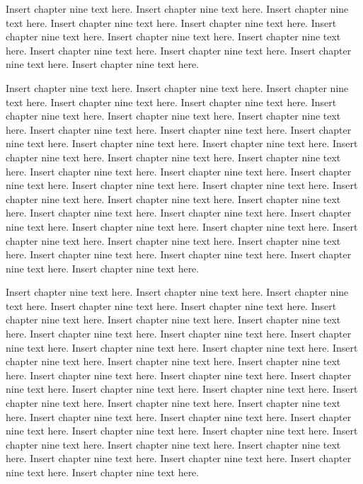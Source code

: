 Insert chapter nine text here. Insert chapter nine text here. Insert chapter nine text here. Insert chapter nine text here. Insert chapter nine text here. Insert chapter nine text here. Insert chapter nine text here. Insert chapter nine text here. Insert chapter nine text here. Insert chapter nine text here. Insert chapter nine text here. Insert chapter nine text here.

Insert chapter nine text here. Insert chapter nine text here. Insert chapter nine text here. Insert chapter nine text here. Insert chapter nine text here. Insert chapter nine text here. Insert chapter nine text here. Insert chapter nine text here. Insert chapter nine text here. Insert chapter nine text here. Insert chapter nine text here. Insert chapter nine text here. Insert chapter nine text here. Insert chapter nine text here. Insert chapter nine text here. Insert chapter nine text here. Insert chapter nine text here. Insert chapter nine text here. Insert chapter nine text here. Insert chapter nine text here. Insert chapter nine text here. Insert chapter nine text here. Insert chapter nine text here. Insert chapter nine text here. Insert chapter nine text here. Insert chapter nine text here. Insert chapter nine text here. Insert chapter nine text here. Insert chapter nine text here. Insert chapter nine text here. Insert chapter nine text here. Insert chapter nine text here. Insert chapter nine text here. Insert chapter nine text here. Insert chapter nine text here. Insert chapter nine text here.

Insert chapter nine text here. Insert chapter nine text here. Insert chapter nine text here. Insert chapter nine text here. Insert chapter nine text here. Insert chapter nine text here. Insert chapter nine text here. Insert chapter nine text here. Insert chapter nine text here. Insert chapter nine text here. Insert chapter nine text here. Insert chapter nine text here. Insert chapter nine text here. Insert chapter nine text here. Insert chapter nine text here. Insert chapter nine text here. Insert chapter nine text here. Insert chapter nine text here. Insert chapter nine text here. Insert chapter nine text here. Insert chapter nine text here. Insert chapter nine text here. Insert chapter nine text here. Insert chapter nine text here. Insert chapter nine text here. Insert chapter nine text here. Insert chapter nine text here. Insert chapter nine text here. Insert chapter nine text here. Insert chapter nine text here. Insert chapter nine text here. Insert chapter nine text here. Insert chapter nine text here. Insert chapter nine text here. Insert chapter nine text here. Insert chapter nine text here.

